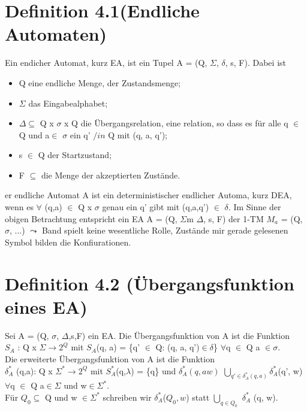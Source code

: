 \documentclass[a4paper,11pt]{article}
\begin{document}
\section*{Definition 4.1(Endliche Automaten)}
Ein endicher Automat, kurz EA, ist ein Tupel A = (Q, $\Sigma$, $\delta$, s, F). Dabei ist 
\begin{itemize}
    \item Q eine endliche Menge, der Zustandsmenge;
    \item $\Sigma$ das Eingabealphabet;
    \item $\Delta \subseteq$ Q x $\sigma$ x Q die Übergangsrelation, eine relation, so dass es für alle q $\in$ Q und a$\in$ $\sigma$ ein q' $/in$ Q mit (q, a, q');
    \item s $\in$ Q der Startzustand;
    \item F $\subseteq$ die Menge der akzeptierten Zustände.
\end{itemize}
er endliche Automat A ist ein deterministischer endlicher Automa,
kurz DEA, wenn es $\forall$ (q,a) $\in$ Q x $\sigma$ genau ein q' gibt mit (q,a,q') $\in$ $\delta$. 
Im Sinne der obigen Betrachtung entspricht ein EA A = (Q, $\Sigma$m $\Delta$, s, F) der 1-TM $M_{a}$ = (Q, $\sigma$, ...)
$\leadsto $ Band spielt keine wesentliche Rolle, Zustände mir gerade gelesenen Symbol bilden die Konfiurationen.

\section*{Definition 4.2 (Übergangsfunktion eines EA)}
Sei A = (Q, $\sigma$, $\Delta$,s,F) ein EA. 
Die Übergangsfunktion von A ist die Funktion \\
$S_{A}$ : Q x $\Sigma \to 2^{Q}$ mit $S_{A}$(q, a) = \{q' $\in$ Q: (q, a, q')$\in \delta$\} $\forall$q $\in$ Q a $\in \sigma$.\\
Die erweiterte Übergangsfunktion von A ist die Funktion \\
$\delta_{A}^{*}$ (q,a): Q x $\Sigma^{*} \to 2^{Q}$ mit $S_{A}^{*}$(q,$\lambda$) = \{q\} und $\delta_{A}^{*}(q, aw)$ $\underset{q' \in \delta_{A}^{*}(q,a)}{\bigcup} \delta_{A}^{*}$(q', w) $\forall$q $\in$ Q a$\in \Sigma$ und w$\in \Sigma^{*}$.\\
Für $Q_{0} \subseteq $ Q und w $\in \Sigma^{*}$ schreiben wir $\delta_{A}^{*} $($Q_{0}, w$) statt $\underset{q \in Q_{0}}{\bigcup}$ $\delta_{A}^{*}$ (q, w).
\end{document}
